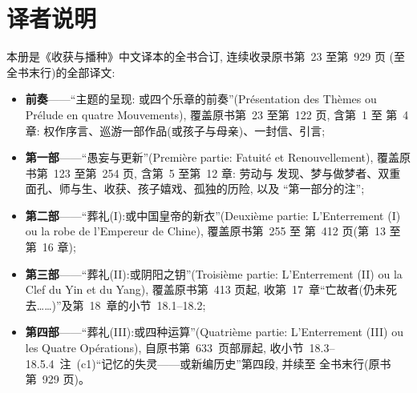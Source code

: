 \documentclass[
    PaperSize=a4paper,
    HeadingFont=hei,
    Biblatex=false,
    BookTitleCN={收获与播种},
    Translator={数译},
    LogoFile=logo.pdf
]{mathtranslation}
\begin{document}
\frontmatter
\makecover

\chapter*{译者说明}

本册是《收获与播种》中文译本的全书合订, 连续收录原书第~23 至第~929 页
(至全书末行)的全部译文:

\begin{itemize}
  \item \textbf{前奏}——“主题的呈现: 或四个乐章的前奏”(Présentation des Thèmes
        ou Prélude en quatre Mouvements), 覆盖原书第~23 至第~122 页, 含第~1 至
        第~4 章: 权作序言、巡游一部作品(或孩子与母亲)、一封信、引言;
  \item \textbf{第一部}——“愚妄与更新”(Première partie: Fatuité et
        Renouvellement), 覆盖原书第~123 至第~254 页, 含第~5 至第~12 章: 劳动与
        发现、梦与做梦者、双重面孔、师与生、收获、孩子嬉戏、孤独的历险, 以及
        “第一部分的注”;
  \item \textbf{第二部}——“葬礼(I):或中国皇帝的新衣”(Deuxième partie:
        L'Enterrement (I) ou la robe de l'Empereur de Chine), 覆盖原书第~255 至
        第~412 页(第~13 至第~16 章);
  \item \textbf{第三部}——“葬礼(II):或阴阳之钥”(Troisième partie:
        L'Enterrement (II) ou la Clef du Yin et du Yang), 覆盖原书第~413 页起,
        收第~17~章“亡故者(仍未死去……)”及第~18~章的小节~18.1--18.2;
  \item \textbf{第四部}——“葬礼(III):或四种运算”(Quatrième partie:
        L'Enterrement (III) ou les Quatre Opérations), 自原书第~633~页部扉起,
        收小节~18.3--18.5.4~注~(c1)“记忆的失灵——或新编历史”第四段, 并续至
        全书末行(原书第~929 页)。
\end{itemize}

\CommonNoteBody

\makecontents

\mainmatter

\end{document}
